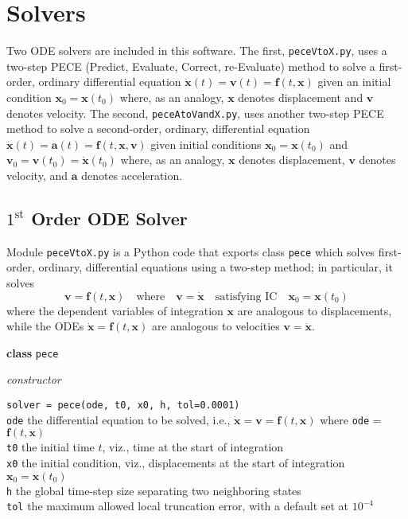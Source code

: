 \section{Solvers}
\label{appSolvers}

Two ODE solvers are included in this software.  The first, \texttt{peceVtoX.py}, uses a two-step PECE (Predict, Evaluate, Correct, re-Evaluate) method to solve a first-order, ordinary differential equation $\dot{\mathbf{x}}(t) = \mathbf{v}(t) = \mathbf{f} (t, \mathbf{x})$ given an initial condition $\mathbf{x}_0 = \mathbf{x}(t_0)$ where, as an analogy, $\mathbf{x}$ denotes displacement and $\mathbf{v}$ denotes velocity.  The second, \texttt{peceAtoVandX.py}, uses another two-step PECE method to solve a second-order, ordinary, differential equation $\ddot{\mathbf{x}}(t) = \mathbf{a}(t) = \mathbf{f}(t, \mathbf{x}, \mathbf{v})$ given initial conditions $\mathbf{x}_0 = \mathbf{x}(t_0)$ and $\mathbf{v}_0 = \mathbf{v}(t_0) = \dot{\mathbf{x}}(t_0)$ where, as an analogy, $\mathbf{x}$ denotes displacement, $\mathbf{v}$ denotes velocity, and $\mathbf{a}$ denotes acceleration.

\subsection{$\mathit{1}^{\text{st}}$ Order ODE Solver}
\label{app1stOrderODEs}

Module \texttt{peceVtoX.py} is a Python code that exports class \texttt{pece} which solves first-order, ordinary, differential equations using a two-step method; in particular, it solves
\begin{displaymath}
    \mathbf{v} = \mathbf{f}(t,\mathbf{x}) 
    \quad \text{where} \quad
    \mathbf{v} = \dot{\mathbf{x}}
    \quad \text{satisfying IC} \quad
    \mathbf{x}_0 = \mathbf{x}(t_0)  
\end{displaymath}
where the dependent variables of integration $\mathbf{x}$ are analogous to displacements, while the ODEs $\dot{\mathbf{x}} = \mathbf{f}(t, \mathbf{x})$ are analogous to velocities $\mathbf{v} = \dot{\mathbf{x}}$.

\bigskip\noindent
\textbf{class} \texttt{pece}

\medskip\noindent
\textit{constructor}

\medskip\noindent
\texttt{solver = pece(ode, t0, x0, h, tol=0.0001)} \\
\indent \texttt{ode} \; the differential equation to be solved, i.e., $\dot{\mathbf{x}} = \mathbf{v} = \mathbf{f} (t, \mathbf{x})$ where \texttt{ode} = $\mathbf{f}(t,\mathbf{x})$ \\
\indent \texttt{t0} \;\;\; the initial time $t$, viz., time at the start of integration \\
\indent \texttt{x0} \;\;\; the initial condition, viz., displacements at the start of integration $\mathbf{x}_0 = \mathbf{x}(t_0)$  \\
\indent \texttt{h} \;\;\;\;\; the global time-step size separating two neighboring states \\
\indent \texttt{tol} \;\hspace{1pt} the maximum allowed local truncation error, with a default set at $10^{-4}$

